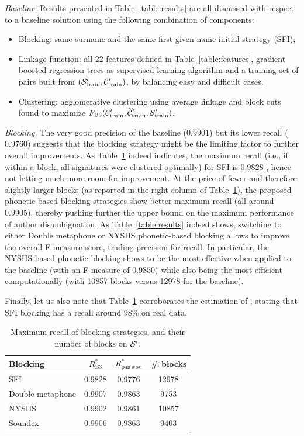 \documentclass{article}
\begin{document}
\textit{Baseline.} Results presented in Table~\ref{table:results} are all discussed with
respect to a baseline solution using the following combination of components:
\begin{itemize}
\item Blocking: same surname and the same first given name initial strategy (SFI);
\item Linkage function: all 22 features defined in Table~\ref{table:features},
    gradient boosted regression trees as supervised learning algorithm
    and a training set of pairs built from $({\cal S}_\text{train}^\prime, {\cal C}_\text{train}^\prime)$, by balancing easy and difficult cases.
\item Clustering: agglomerative clustering using average linkage and
    block cuts found to maximize $F_\text{B3}({\cal C}_\text{train}^\prime, \widehat{\cal C}_\text{train}^\prime, {\cal S}_\text{train}^\prime)$.
\end{itemize}


\textit{Blocking.} The very good precision of the baseline ($0.9901$) but its
lower recall ($0.9760$) suggests that the blocking strategy might be the
limiting factor to further overall improvements. As Table~\ref{table:blocking}
indeed indicates, the maximum recall (i.e., if within a block, all signatures
were clustered optimally) for SFI is $0.9828$ , hence not letting much more
room for improvement. At the price of fewer and therefore slightly larger
blocks (as reported in the right column of Table~\ref{table:blocking}), the
proposed phonetic-based blocking strategies show better maximum recall (all
around $0.9905$), thereby pushing further the upper bound on the maximum
performance of author disambiguation. As Table~\ref{table:results} indeed shows,
switching to either Double metaphone or NYSIIS phonetic-based blocking allows
to improve the overall F-measure score, trading precision for recall. In particular,
the NYSIIS-based phonetic blocking shows to be the most effective when applied
to the baseline (with an F-measure of $0.9850$) while also being the most
efficient computationally (with 10857 blocks versus 12978 for the baseline).

Finally, let us also note that Table~\ref{table:blocking} corroborates the
estimation of \citep{torvik2009author}, stating that SFI blocking has a recall
around $98\%$ on real data.

\begin{table}
\caption{Maximum recall of blocking strategies, and their number of blocks on ${\cal S}^\prime$.}
\label{table:blocking}
\centering
\begin{tabular}{|l|cc|c|}
  \hline
  \textbf{Blocking} & $R_\text{B3}^*$ & $R_\text{pairwise}^*$ & \# blocks \\
  \hline
  \hline
    SFI & 0.9828 & 0.9776 & 12978 \\
    Double metaphone & 0.9907 & 0.9863 & 9753 \\
    NYSIIS & 0.9902 & 0.9861 & 10857 \\
    Soundex & 0.9906 & 0.9863 & 9403 \\
  \hline
\end{tabular}
\end{table}
\end{document}
